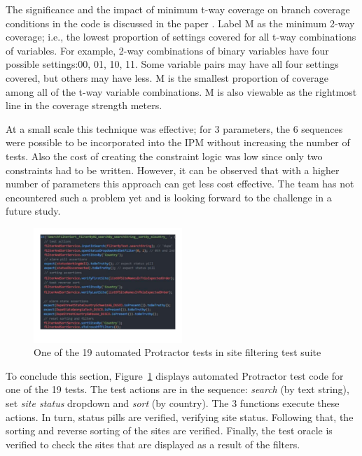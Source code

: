 \documentclass[conference]{IEEEtran}
\begin{document}
	The significance and the impact of minimum t-way coverage on branch coverage conditions in the code is discussed in the paper \cite{kuhn2016measuring}.
	Label M as the minimum 2-way coverage; i.e., the lowest proportion of settings covered for all t-way combinations of variables.
	For example, 2-way combinations of binary variables have four possible settings:00, 01, 10, 11.
	Some variable pairs may have all four settings covered, but others may have less.
	M is the smallest proportion of coverage among all of the t-way variable combinations.
	M is also viewable as the rightmost line in the coverage strength meters.

	At a small scale this technique was effective; for 3 parameters, the 6 sequences were possible to be incorporated into the IPM without increasing the number of tests. 
	Also the cost of creating the constraint logic was low since only two constraints had to be written.
	However, it can be observed that with a higher number of parameters this approach can get less cost effective. 
	The team has not encountered such a problem yet and is looking forward to the challenge in a future study.
	
	\begin{figure}[!h]
		\includegraphics[width=0.50\textwidth,]{sortingTestCode.pdf}
		\caption{One of the 19 automated Protractor tests in site filtering test suite}
		\label{fig:sortingTestCode}
	\end{figure}

	To conclude this section, Figure~\ref{fig:sortingTestCode} displays automated Protractor test code for one of the 19 tests.
	The test actions are in the sequence: \textit{search} (by text string), set \textit{site status} dropdown and \textit{sort} (by country). 
	The 3 functions execute these actions.
	In turn, status pills are verified, verifying site status.
	Following that, the sorting and reverse sorting of the sites are verified.
	Finally, the test oracle is verified to check the sites that are displayed as a result of the filters.
		
\end{document}
